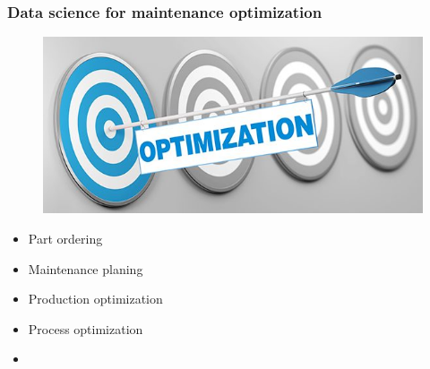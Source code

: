 \documentclass{beamer}
\begin{document}
\begin{frame}
	\frametitle{Data science for maintenance optimization}
		\begin{figure}[H]
			\centering
			\includegraphics[width=0.5\linewidth]{optimization}
		\end{figure}
	\begin{itemize}
		\item Part ordering
		\item Maintenance planing
		\item Production optimization
		\item Process optimization
		\item
	\end{itemize}
\end{frame}

\end{document}
